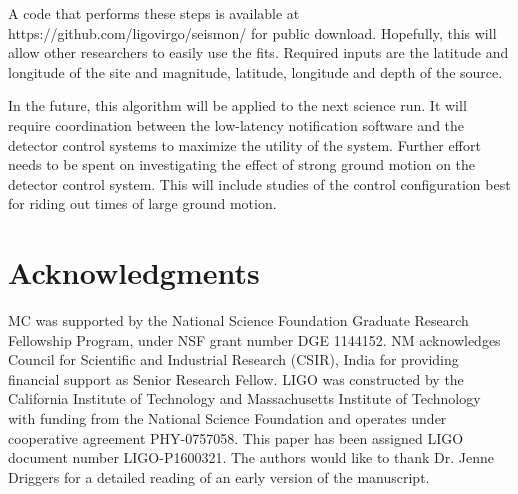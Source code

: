 \documentclass[twocolumn, aps, superscriptaddress]{revtex4}
\begin{document}
A code that performs these steps is available at https://github.com/ligovirgo/seismon/ for public download. Hopefully, this will allow other researchers to easily use the fits. Required inputs are the latitude and longitude of the site and magnitude, latitude, longitude and depth of the source.

In the future, this algorithm will be applied to the next science run. It will require coordination between the low-latency notification software and the detector control systems to maximize the utility of the system. 
Further effort needs to be spent on investigating the effect of strong ground motion on the detector control system.
This will include studies of the control configuration best for riding out times of large ground motion.

\section{Acknowledgments}
MC was supported by the National Science Foundation Graduate Research Fellowship
Program, under NSF grant number DGE 1144152. 
NM acknowledges Council for Scientific and Industrial Research (CSIR), India for providing financial support as Senior Research Fellow.  
LIGO was constructed by the California Institute of Technology and Massachusetts Institute of Technology with funding from the National Science Foundation and operates under cooperative agreement PHY-0757058.
This paper has been assigned LIGO document number LIGO-P1600321.
The authors would like to thank Dr. Jenne Driggers for a detailed reading of an early version of the manuscript.



\end{document}
